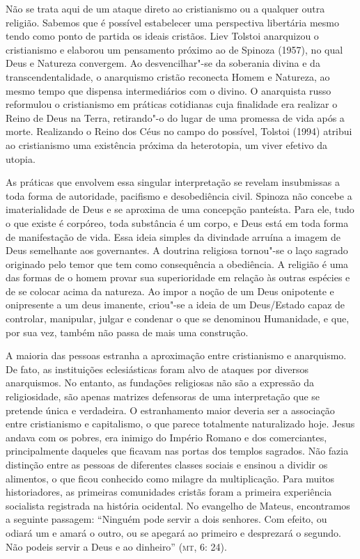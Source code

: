 Não se trata aqui de um ataque direto ao cristianismo ou a qualquer
outra religião. Sabemos que é possível estabelecer uma perspectiva
libertária mesmo tendo como ponto de partida os ideais cristãos. Liev
Tolstoi anarquizou o cristianismo e elaborou um pensamento próximo ao de
Spinoza (1957), no qual Deus e Natureza convergem. Ao desvencilhar"-se da
soberania divina e da transcendentalidade, o anarquismo cristão
reconecta Homem e Natureza, ao mesmo tempo que dispensa intermediários
com o divino. O anarquista russo reformulou o cristianismo em práticas
cotidianas cuja finalidade era realizar o Reino de Deus na Terra,
retirando"-o do lugar de uma promessa de vida após a morte. Realizando o
Reino dos Céus no campo do possível, Tolstoi (1994) atribui ao
cristianismo uma existência próxima da heterotopia, um viver efetivo da
utopia.

As práticas que envolvem essa singular interpretação se revelam
insubmissas a toda forma de autoridade, pacifismo e desobediência civil.
Spinoza não concebe a imaterialidade de Deus e se aproxima de uma
concepção panteísta. Para ele, tudo o que existe é corpóreo, toda
substância é um corpo, e Deus está em toda forma de manifestação de
vida. Essa ideia simples da divindade arruína a imagem de Deus
semelhante aos governantes. A doutrina religiosa tornou"-se o laço
sagrado originado pelo temor que tem como consequência a obediência. A
religião é uma das formas de o homem provar sua superioridade em relação
às outras espécies e de se colocar acima da natureza. Ao impor a noção
de um Deus onipotente e onipresente a um deus imanente, criou"-se a ideia
de um Deus/Estado capaz de controlar, manipular, julgar e condenar o que
se denominou Humanidade, e que, por sua vez, também não passa de mais
uma construção.

A maioria das pessoas estranha a aproximação entre cristianismo e
anarquismo. De fato, as instituições eclesiásticas foram alvo de ataques
por diversos anarquismos. No entanto, as fundações religiosas não são a
expressão da religiosidade, são apenas matrizes defensoras de uma
interpretação que se pretende única e verdadeira. O estranhamento maior
deveria ser a associação entre cristianismo e capitalismo, o que parece
totalmente naturalizado hoje. Jesus andava com os pobres, era inimigo do
Império Romano e dos comerciantes, principalmente daqueles que ficavam
nas portas dos templos sagrados. Não fazia distinção entre as pessoas de
diferentes classes sociais e ensinou a dividir os alimentos, o que ficou
conhecido como milagre da multiplicação. Para muitos historiadores, as
primeiras comunidades cristãs foram a primeira experiência socialista
registrada na história ocidental. No evangelho de Mateus, encontramos a
seguinte passagem: ``Ninguém pode servir a dois senhores. Com efeito, ou
odiará um e amará o outro, ou se apegará ao primeiro e desprezará o
segundo. Não podeis servir a Deus e ao dinheiro'' (\textsc{mt}, 6: 24).

